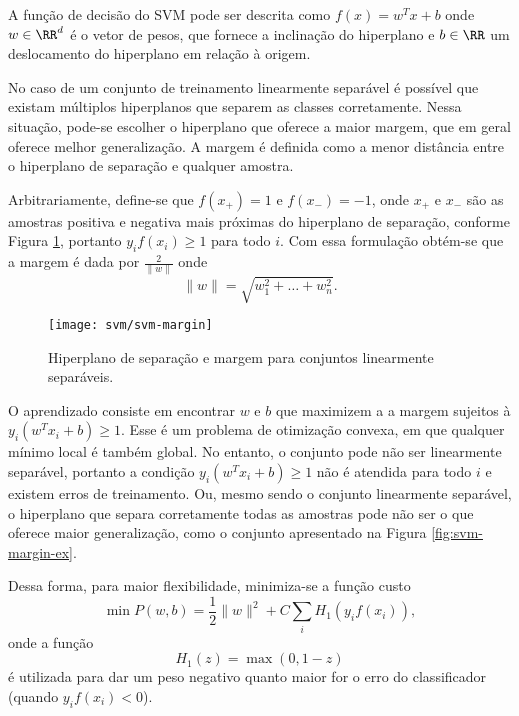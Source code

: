 A função de decisão do SVM pode ser descrita como $f(x)=w^T x+ b$ onde $w \in \RR^d$ é o vetor de pesos, que fornece a inclinação do hiperplano e $b \in \RR$ um deslocamento do hiperplano em relação à origem. 

No caso de um conjunto de treinamento linearmente separável é possível que existam múltiplos hiperplanos que separem as classes corretamente. Nessa situação, pode-se escolher o hiperplano que oferece a maior margem, que em geral oferece melhor generalização. A margem é definida como a menor distância entre o hiperplano de separação e qualquer amostra. 

Arbitrariamente, define-se que $f(x_+)=1$ e $f(x_-)=-1$, onde $x_+$ e $x_-$ são as amostras positiva e negativa mais próximas do hiperplano de separação, conforme Figura \ref{fig:svm-margin}, portanto $y_i f(x_i) \geq 1$ para todo $i$. Com essa formulação obtém-se que a margem é dada por $\frac{2}{\|w\|}$ onde
\begin{equation}
\|w\| = \sqrt{w_1^2 + \dots + w_n^2}.
\end{equation}

\begin{figure}
\centering
\texttt{[image: svm/svm-margin]}
\caption{Hiperplano de separação e margem para conjuntos linearmente separáveis.}
\label{fig:svm-margin}
\end{figure}

O aprendizado consiste em encontrar $w$ e $b$ que maximizem a a margem sujeitos à $y_i(w^T x_i+b) \geq 1$. Esse é um problema de otimização convexa, em que qualquer mínimo local é também global. No entanto, o conjunto pode não ser linearmente separável, portanto a condição $y_i(w^T x_i+b) \geq 1$ não é atendida para todo $i$ e existem erros de treinamento. Ou, mesmo sendo o conjunto linearmente separável, o hiperplano que separa corretamente todas as amostras pode não ser o que oferece maior generalização, como o conjunto apresentado na Figura \ref{fig:svm-margin-ex}. 

Dessa forma, para maior flexibilidade, minimiza-se a função custo \cite{bishop2007}
\begin{equation}
	\label{eq:svm-cost}
	\min P(w,b) = \frac{1}{2}\|w\|^2 + C\sum_i H_1(y_i f(x_i)),
\end{equation}
onde a função
\begin{equation*}
H_1(z)=\max(0,1-z)
\end{equation*}
é utilizada para dar um peso negativo quanto maior for o erro do classificador (quando $y_i f(x_i)<0$).

